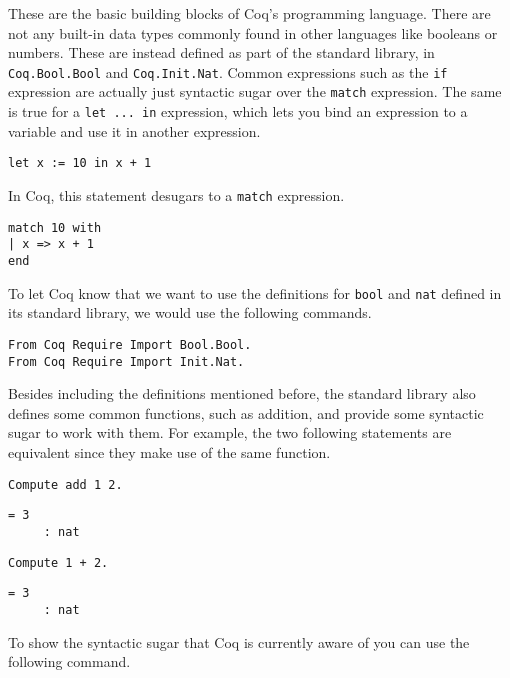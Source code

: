 These are the basic building blocks of Coq's programming language. There are not any built-in data 
types commonly found in other languages like booleans or numbers. These are instead defined as part of 
the standard library, in \texttt{Coq.Bool.Bool} and \texttt{Coq.Init.Nat}. Common 
expressions such as the \texttt{if} expression are actually just syntactic sugar over the
\texttt{match} expression. The same is true for a \texttt{let ... in} expression, 
which lets you bind an expression to a variable and use it in another expression.
\begin{verbatim}
let x := 10 in x + 1
\end{verbatim}
\noindent In Coq, this statement desugars to a \texttt{match} expression.
\begin{verbatim}
match 10 with
| x => x + 1
end
\end{verbatim}

To let Coq know that we want to use the definitions for \texttt{bool} and 
\texttt{nat} defined in its standard library, we would use the following commands.

\begin{verbatim}
From Coq Require Import Bool.Bool.
From Coq Require Import Init.Nat.
\end{verbatim}

Besides including the definitions mentioned before, the standard library also defines some
common functions, such as addition, and provide some syntactic sugar to work with them. For example, 
the two following statements are equivalent since they make use of the same function.

\begin{verbatim}
Compute add 1 2.
\end{verbatim}
\vspace{-\baselineskip*13/10}
\begin{verbatim}
= 3
     : nat
\end{verbatim}

\begin{verbatim}
Compute 1 + 2.
\end{verbatim}
\vspace{-\baselineskip*13/10}
\begin{verbatim}
= 3
     : nat
\end{verbatim}

To show the syntactic sugar that Coq is currently aware of you can use the following command. 

